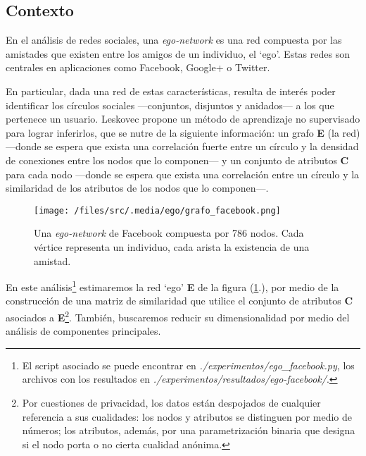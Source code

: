 
\vspace{2em}
\subsection{Contexto} 

En el análisis de redes sociales, una \textit{ego-network} \cite{Leskovec} es una red compuesta por las amistades que existen entre los amigos de un individuo, el `ego'. Estas redes son centrales en aplicaciones como Facebook, Google+ o Twitter. 

\vspace{1em}
En particular, dada una red de estas características, resulta de interés poder identificar los círculos sociales ---conjuntos, disjuntos y anidados--- a los que pertenece un usuario. Leskovec \cite{Leskovec} propone un método de aprendizaje no supervisado para lograr inferirlos, que se nutre de la siguiente información: un grafo \textbf{E} (la red) ---donde se espera que exista una correlación fuerte entre un círculo y la densidad de conexiones entre los nodos que lo componen--- y un conjunto de atributos \textbf{C} para cada nodo ---donde se espera que exista una correlación entre un círculo y la similaridad de los atributos de los nodos que lo componen---.

\vspace{1em}
\begin{figure}[!htbp]
\texttt{[image: /files/src/.media/ego/grafo\_facebook.png]}
\caption{Una \textit{ego-network} de Facebook compuesta por 786 nodos. Cada vértice representa un individuo, cada arista la existencia de una amistad.} \label{ego_facebook}
\end{figure}

\vspace{1em}
En este análisis\footnote{El script asociado se puede encontrar en \textit{./experimentos/ego\_facebook.py}, los archivos con los resultados  en \textit{./experimentos/resultados/ego-facebook/}.} estimaremos la red `ego' \textbf{E} de la figura (\ref{ego_facebook}.), por medio de la construcción de una matriz de similaridad que utilice el conjunto de atributos \textbf{C} asociados a \textbf{E}\footnote{Por cuestiones de privacidad, los datos están despojados de cualquier referencia a sus cualidades: los nodos y atributos se distinguen por medio de números; los atributos, además, por una parametrización binaria que designa si el nodo porta o no cierta cualidad anónima.}. También, buscaremos reducir su dimensionalidad por medio del análisis de componentes principales.





